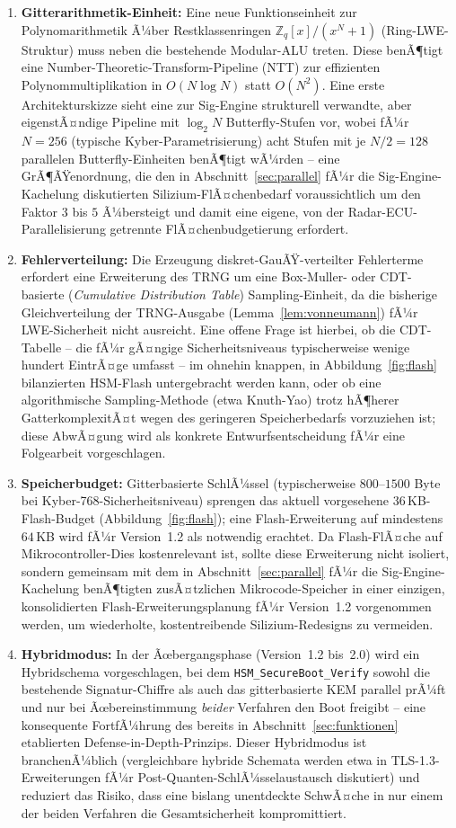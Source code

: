 ﻿\documentclass[a4paper,12pt]{article}
\theoremstyle{definition}
\begin{document}
\begin{enumerate}
	\item \textbf{Gitterarithmetik-Einheit:} Eine neue Funktionseinheit zur Polynomarithmetik Ã¼ber Restklassenringen $\mathbb{Z}_q[x]/(x^N+1)$ (Ring-LWE-Struktur) muss neben die bestehende Modular-ALU treten. Diese benÃ¶tigt eine Number-Theoretic-Transform-Pipeline (NTT) zur effizienten Polynommultiplikation in $O(N \log N)$ statt $O(N^2)$. Eine erste Architekturskizze sieht eine zur Sig-Engine strukturell verwandte, aber eigenstÃ¤ndige Pipeline mit $\log_2 N$ Butterfly-Stufen vor, wobei fÃ¼r $N=256$ (typische Kyber-Parametrisierung) acht Stufen mit je $N/2=128$ parallelen Butterfly-Einheiten benÃ¶tigt wÃ¼rden -- eine GrÃ¶ÃŸenordnung, die den in Abschnitt~\ref{sec:parallel} fÃ¼r die Sig-Engine-Kachelung diskutierten Silizium-FlÃ¤chenbedarf voraussichtlich um den Faktor $3$ bis $5$ Ã¼bersteigt und damit eine eigene, von der Radar-ECU-Parallelisierung getrennte FlÃ¤chenbudgetierung erfordert.
	\item \textbf{Fehlerverteilung:} Die Erzeugung diskret-GauÃŸ-verteilter Fehlerterme erfordert eine Erweiterung des TRNG um eine Box-Muller- oder CDT-basierte (\emph{Cumulative Distribution Table}) Sampling-Einheit, da die bisherige Gleichverteilung der TRNG-Ausgabe (Lemma~\ref{lem:vonneumann}) fÃ¼r LWE-Sicherheit nicht ausreicht. Eine offene Frage ist hierbei, ob die CDT-Tabelle -- die fÃ¼r gÃ¤ngige Sicherheitsniveaus typischerweise wenige hundert EintrÃ¤ge umfasst -- im ohnehin knappen, in Abbildung~\ref{fig:flash} bilanzierten HSM-Flash untergebracht werden kann, oder ob eine algorithmische Sampling-Methode (etwa Knuth-Yao) trotz hÃ¶herer GatterkomplexitÃ¤t wegen des geringeren Speicherbedarfs vorzuziehen ist; diese AbwÃ¤gung wird als konkrete Entwurfsentscheidung fÃ¼r eine Folgearbeit vorgeschlagen.
	\item \textbf{Speicherbudget:} Gitterbasierte SchlÃ¼ssel (typischerweise $800$--$1500$ Byte bei Kyber-768-Sicherheitsniveau) sprengen das aktuell vorgesehene $36$\,KB-Flash-Budget (Abbildung~\ref{fig:flash}); eine Flash-Erweiterung auf mindestens $64$\,KB wird fÃ¼r Version~1.2 als notwendig erachtet. Da Flash-FlÃ¤che auf Mikrocontroller-Dies kostenrelevant ist, sollte diese Erweiterung nicht isoliert, sondern gemeinsam mit dem in Abschnitt~\ref{sec:parallel} fÃ¼r die Sig-Engine-Kachelung benÃ¶tigten zusÃ¤tzlichen Mikrocode-Speicher in einer einzigen, konsolidierten Flash-Erweiterungsplanung fÃ¼r Version~1.2 vorgenommen werden, um wiederholte, kostentreibende Silizium-Redesigns zu vermeiden.
	\item \textbf{Hybridmodus:} In der Ãœbergangsphase (Version~1.2 bis~2.0) wird ein Hybridschema vorgeschlagen, bei dem \texttt{HSM\_SecureBoot\_Verify} sowohl die bestehende Signatur-Chiffre als auch das gitterbasierte KEM parallel prÃ¼ft und nur bei Ãœbereinstimmung \emph{beider} Verfahren den Boot freigibt -- eine konsequente FortfÃ¼hrung des bereits in Abschnitt~\ref{sec:funktionen} etablierten Defense-in-Depth-Prinzips. Dieser Hybridmodus ist branchenÃ¼blich (vergleichbare hybride Schemata werden etwa in TLS-1.3-Erweiterungen fÃ¼r Post-Quanten-SchlÃ¼sselaustausch diskutiert) und reduziert das Risiko, dass eine bislang unentdeckte SchwÃ¤che in nur einem der beiden Verfahren die Gesamtsicherheit kompromittiert.

\end{enumerate}
\end{document}

